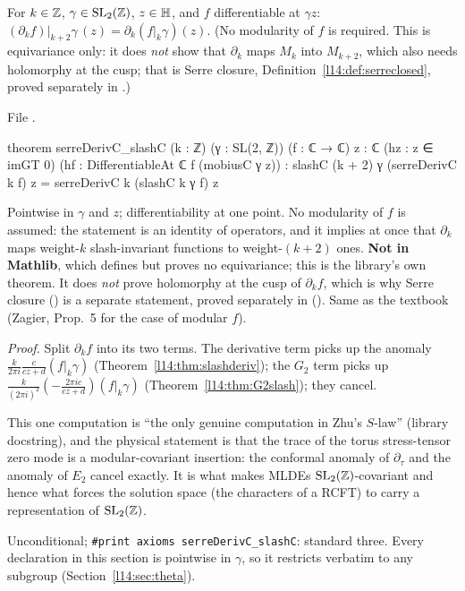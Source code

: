 \begin{theorem}\label{l14:thm:serreslash}
For $k\in{\mathbb{Z}}$, $\gamma\in\mathrm{SL}_2(\mathbb{Z})$, $z\in\mathbb{H}$, and $f$ differentiable at $\gamma z$:
$(\partial_kf)|_{k+2}\gamma\,(z) = \partial_k(f|_k\gamma)(z)$. (No modularity of $f$ is required. This is equivariance only:
it does \emph{not} show that $\partial_k$ maps $M_k$ into $M_{k+2}$, which also needs holomorphy at the cusp; that is
Serre closure, Definition~\ref{l14:def:serreclosed}, proved separately in .)
\end{theorem}
\noindent File .
\begin{leancode}
theorem serreDerivC_slashC (k : ℤ) (γ : SL(2, ℤ)) (f : ℂ → ℂ) {z : ℂ} (hz : z ∈ imGT 0)
    (hf : DifferentiableAt ℂ f (mobiusC γ z)) :
    slashC (k + 2) γ (serreDerivC k f) z = serreDerivC k (slashC k γ f) z
\end{leancode}
\begin{dictionary}
Pointwise in $\gamma$ and $z$; differentiability at one point. No modularity of $f$ is assumed: the statement is an identity of
operators, and it implies at once that $\partial_k$ maps weight-$k$ slash-invariant functions to weight-$(k+2)$ ones.
\textbf{Not in Mathlib}, which defines  but proves no equivariance; this is the library's own theorem.
It does \emph{not} prove holomorphy at the cusp of $\partial_kf$, which is why Serre closure () is
a separate statement, proved separately in  (). Same as the textbook (Zagier, Prop.~5 for the case of modular $f$).
\end{dictionary}
\noindent\emph{Proof.} Split $\partial_kf$ into its two terms. The derivative term picks up the anomaly
$\frac{k}{2\pi i}\frac{c}{cz+d}(f|_k\gamma)$ (Theorem~\ref{l14:thm:slashderiv}); the $G_2$ term picks up
$\frac{k}{(2\pi i)^2}(-\frac{2\pi ic}{cz+d})(f|_k\gamma)$ (Theorem~\ref{l14:thm:G2slash}); they cancel.
\begin{physics}
This one computation is ``the only genuine computation in Zhu's $S$-law'' (library docstring), and the physical statement is
that the trace of the torus stress-tensor zero mode is a modular-covariant insertion: the conformal anomaly of $\partial_\tau$
and the anomaly of $E_2$ cancel exactly. It is what makes MLDEs $\mathrm{SL}_2(\mathbb{Z})$-covariant and hence what forces the solution
space (the characters of a RCFT) to carry a representation of $\mathrm{SL}_2(\mathbb{Z})$.
\end{physics}
\begin{status}
Unconditional; \texttt{\#print axioms serreDerivC\_slashC}: standard three. Every declaration in this section is pointwise in
$\gamma$, so it restricts verbatim to any subgroup (Section~\ref{l14:sec:theta}).
\end{status}

